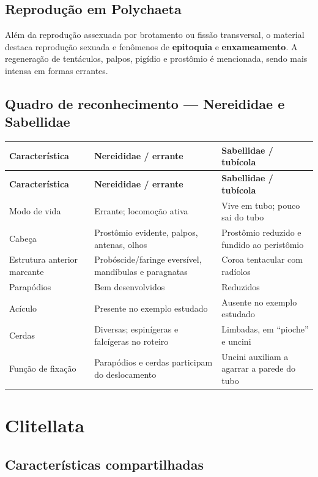 \documentclass[a4paper,12pt]{article}
\newcommand{\termo}[1]{\textbf{#1}}
\begin{document}
\subsection{Reprodução em Polychaeta}

Além da reprodução assexuada por brotamento ou fissão transversal, o material destaca reprodução sexuada e fenômenos de \termo{epitoquia} e \termo{enxameamento}. A regeneração de tentáculos, palpos, pigídio e prostômio é mencionada, sendo mais intensa em formas errantes.

\subsection{Quadro de reconhecimento — Nereididae e Sabellidae}

\begin{longtable}{P{3.3cm}P{5.2cm}P{5.2cm}}
\toprule
\textbf{Característica} & \textbf{Nereididae / errante} & \textbf{Sabellidae / tubícola} \\
\midrule
\endfirsthead
\toprule
\textbf{Característica} & \textbf{Nereididae / errante} & \textbf{Sabellidae / tubícola} \\
\midrule
\endhead
Modo de vida & Errante; locomoção ativa & Vive em tubo; pouco sai do tubo \\
Cabeça & Prostômio evidente, palpos, antenas, olhos & Prostômio reduzido e fundido ao peristômio \\
Estrutura anterior marcante & Probóscide/faringe eversível, mandíbulas e paragnatas & Coroa tentacular com radíolos \\
Parapódios & Bem desenvolvidos & Reduzidos \\
Acículo & Presente no exemplo estudado & Ausente no exemplo estudado \\
Cerdas & Diversas; espinígeras e falcígeras no roteiro & Limbadas, em ``pioche'' e uncini \\
Função de fixação & Parapódios e cerdas participam do deslocamento & Uncini auxiliam a agarrar a parede do tubo \\
\bottomrule
\end{longtable}

\section{Clitellata}

\subsection{Características compartilhadas}
\end{document}
